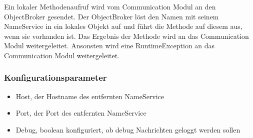 \documentclass{article}
\begin{document}
Ein lokaler Methodenaufruf wird vom Communication Modul an den ObjectBroker gesendet. Der ObjectBroker löst den Namen
mit seinem NameService in ein lokales Objekt auf und führt die Methode auf diesem aus, wenn sie vorhanden ist. Das
Ergebnis der Methode wird an das Communication Modul weitergeleitet. Ansonsten wird eine RuntimeException an das
Communication Modul weitergeleitet.

\subsubsection{Konfigurationsparameter}

\begin{itemize}
    \item Host, der Hostname des entfernten NameService
    \item Port, der Port des entfernten NameService
	\item Debug, boolean konfiguriert, ob debug Nachrichten geloggt werden sollen
\end{itemize}
\end{document}
